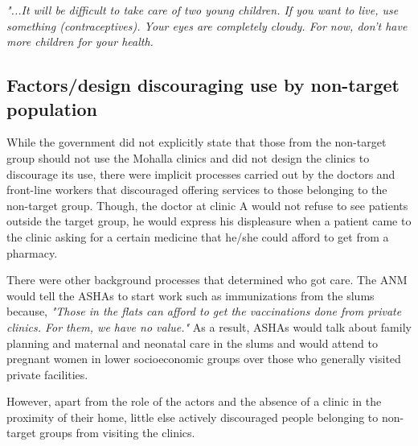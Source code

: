 \textit{"...It will be difficult to take care of two young children. If you want to live, use something (contraceptives). Your eyes are completely cloudy. For now, don’t have more children for your health.}

\subsection{Factors/design discouraging use by non-target population}
While the government did not explicitly state that those from the non-target group should not use the Mohalla clinics and did not design the clinics to discourage its use, there were implicit processes carried out by the doctors and front-line workers that discouraged offering services to those belonging to the non-target group. Though, the doctor at clinic A would not refuse to see patients outside the target group, he would express his displeasure when a patient came to the clinic asking for a certain medicine that he/she could afford to get from a pharmacy.

There were other background processes that determined who got care. The ANM would tell the ASHAs to start work such as immunizations from the slums because, \textit{"Those in the flats can afford to get the vaccinations done from private clinics. For them, we have no value."} As a result, ASHAs would talk about family planning and maternal and neonatal care in the slums and would attend to pregnant women in lower socioeconomic groups over those who generally visited private facilities. %

However, apart from the role of the actors and the absence of a clinic in the proximity of their home, little else actively discouraged people belonging to non-target groups from visiting the clinics.